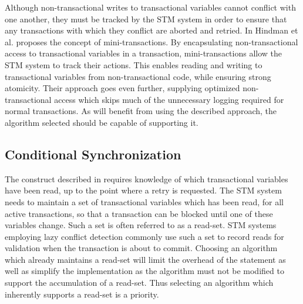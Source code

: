 Although non-transactional writes to transactional variables cannot conflict with one another, they must be tracked by the \ac{STM} system in order to ensure that any transactions with which they conflict are aborted and retried. In \cite{hindman2006atomicity} Hindman et al. proposes the concept of mini-transactions. By encapsulating non-transactional access to transactional variables in a transaction, mini-transactions allow the \ac{STM} system to track their actions. This enables reading and writing to transactional variables from non-transactional code, while ensuring strong atomicity. Their approach goes even further, supplying optimized non-transactional access which skips much of the unnecessary logging required for normal transactions. As \stmnamesp will benefit from using the described approach, the algorithm selected should be capable of supporting it.
 
\subsection{Conditional Synchronization}
\label{subsec:stm_impl_selection_conditional}
The  construct described in  requires knowledge of which transactional variables have been read, up to the point where a retry is requested\cite{harris2005composable}. The \ac{STM} system needs to maintain a set of transactional variables which has been read, for all active transactions, so that a transaction can be blocked until one of these variables change. Such a set is often referred to as a read-set\cite{dice2006transactional}\cite{harris2010transactional}\cite{herlihy2012art}. \ac{STM} systems employing lazy conflict detection commonly use such a set to record reads for validation when the transaction is about to commit\cite{dice2006transactional}\cite{mohamedin2013bytestm}. Choosing an algorithm which already maintains a read-set will limit the overhead of the  statement as well as simplify the implementation as the algorithm must not be modified to support the accumulation of a read-set. Thus selecting an algorithm which inherently supports a read-set is a priority.

